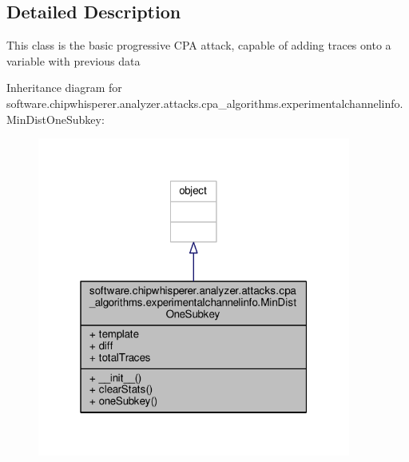 \subsection{Detailed Description}
\begin{DoxyVerb}This class is the basic progressive CPA attack, capable of adding traces onto a variable with previous data\end{DoxyVerb}
 

Inheritance diagram for software.\+chipwhisperer.\+analyzer.\+attacks.\+cpa\+\_\+algorithms.\+experimentalchannelinfo.\+Min\+Dist\+One\+Subkey\+:\nopagebreak
\begin{figure}[H]
\begin{center}
\leavevmode
\includegraphics[width=292pt]{da/df6/classsoftware_1_1chipwhisperer_1_1analyzer_1_1attacks_1_1cpa__algorithms_1_1experimentalchannelid55573fdf49df31abfa6f47b4ee76397}
\end{center}
\end{figure}


